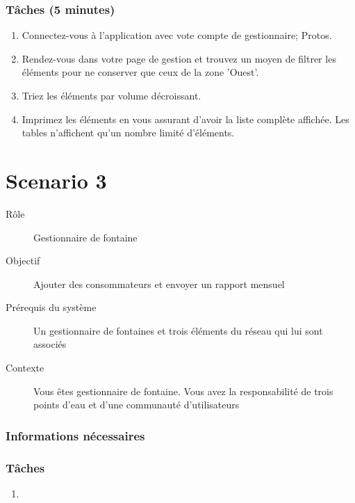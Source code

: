 \documentclass[a4paper, 11pt]{article}
\begin{document}
    \subsubsection*{Tâches (5 minutes)}
        \begin{enumerate}
            \item Connectez-vous à l'application avec vote compte de gestionnaire; Protos.
            \item Rendez-vous dans votre page de gestion et trouvez un moyen de filtrer les éléments pour ne conserver que ceux de la zone 'Ouest'.
            \item Triez les éléments par volume décroissant.
            \item Imprimez les éléments en vous assurant d'avoir la liste complète affichée. Les tables n'affichent qu'un nombre limité d'éléments.
        \end{enumerate}

\newpage

\section*{Scenario 3}
    \begin{description}
        \item[Rôle] Gestionnaire de fontaine
        \item[Objectif] Ajouter des consommateurs et envoyer un rapport mensuel
        \item[Prérequis du système] Un gestionnaire de fontaines et trois éléments du réseau qui lui sont associés
        \item[Contexte] Vous êtes gestionnaire de fontaine. Vous avez la responsabilité de trois points d'eau et d'une communauté d'utilisateurs
    \end{description}

    \subsubsection*{Informations nécessaires}

    \subsubsection*{Tâches}
        \begin{enumerate}
            \item
        \end{enumerate}

\newpage
\end{document}
